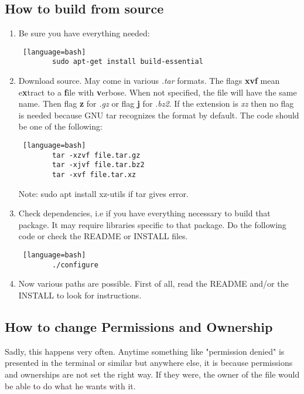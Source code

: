 \subsection{How to build from source}
\begin{enumerate}
    \item Be sure you have everything needed: 
    \begin{lstlisting} [language=bash]
        sudo apt-get install build-essential
    \end{lstlisting}

    \item Download source. May come in various \textit{.tar} formats. The flags \textbf{xvf} mean e\textbf{x}tract to a \textbf{f}ile with \textbf{v}erbose. When not specified, the file will have the same name. Then flag \textbf{z} for \textit{.gz} or flag \textbf{j} for \textit{.bz2}. If the extension is \textit{xz} then no flag is needed because GNU tar recognizes the format by default. The code should be one of the following:
    \begin{lstlisting} [language=bash]
        tar -xzvf file.tar.gz
        tar -xjvf file.tar.bz2
        tar -xvf file.tar.xz
    \end{lstlisting}
    Note: sudo apt install xz-utils if tar gives error.
    
    \item Check dependencies, i.e if you have everything necessary to build that package. It may require libraries specific to that package. Do the following code or check the README or INSTALL files.
    \begin{lstlisting} [language=bash]
        ./configure
    \end{lstlisting}

    \item Now various paths are possible. First of all, read the README and/or the INSTALL to look for instructions. %
\end{enumerate}





\subsection{How to change Permissions and Ownership}
\par Sadly, this happens very often. Anytime something like "permission denied" is presented in the terminal or similar but anywhere else, it is because permissions and ownerships are not set the right way. If they were, the owner of the file would be able to do what he wants with it.

